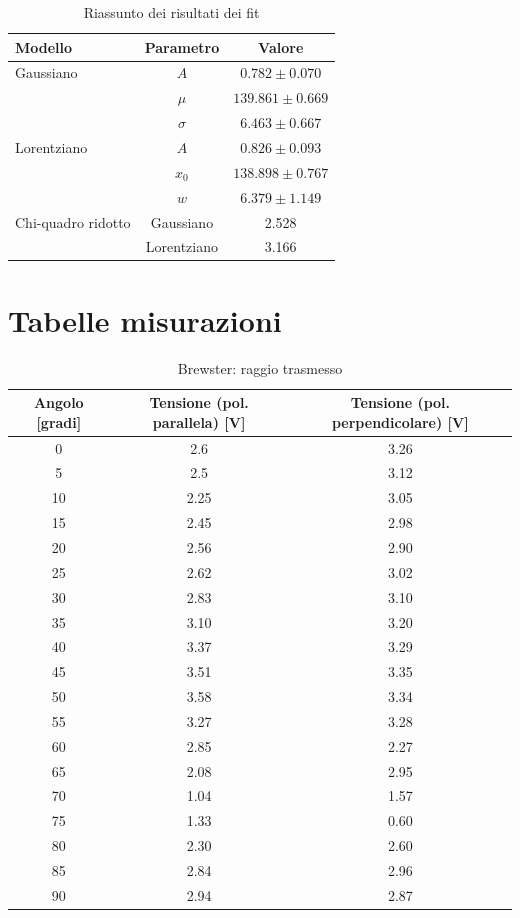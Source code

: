 \documentclass[letterpaper,12pt]{article}
\begin{document}
\begin{table}[h!]
    \centering
    \caption{Riassunto dei risultati dei fit}
    \label{tab:fit_results}
    \begin{tabular}{|l|c|c|}
        \hline
        \textbf{Modello} & \textbf{Parametro} & \textbf{Valore} \\
        \hline
        Gaussiano & $A$ & $0.782 \pm 0.070$ \\
                  & $\mu$ & $139.861 \pm 0.669$ \\
                  & $\sigma$ & $6.463 \pm 0.667$ \\
        \hline
        Lorentziano & $A$ & $0.826 \pm 0.093$ \\
                    & $x_0$ & $138.898 \pm 0.767$ \\
                    & $w$ & $6.379 \pm 1.149$ \\
        \hline
        Chi-quadro ridotto & Gaussiano & 2.528 \\
                            & Lorentziano & 3.166 \\
        \hline
    \end{tabular}
\end{table}

\newpage
\section{Tabelle misurazioni}

\begin{table}[h!]
	\centering
	\begin{tabular}{|c|c|c|}
	\hline
	\textbf{Angolo [gradi]} & \textbf{Tensione (pol. parallela) [V]} & \textbf{Tensione (pol. perpendicolare) [V]} \\
	\hline
	0   & 2.6  & 3.26 \\
	5   & 2.5  & 3.12 \\
	10  & 2.25 & 3.05 \\
	15  & 2.45 & 2.98 \\
	20  & 2.56 & 2.90 \\
	25  & 2.62 & 3.02 \\
	30  & 2.83 & 3.10 \\
	35  & 3.10 & 3.20 \\
	40  & 3.37 & 3.29 \\
	45  & 3.51 & 3.35 \\
	50  & 3.58 & 3.34 \\
	55  & 3.27 & 3.28 \\
	60  & 2.85 & 2.27 \\
	65  & 2.08 & 2.95 \\
	70  & 1.04 & 1.57 \\
	75  & 1.33 & 0.60 \\
	80  & 2.30 & 2.60 \\
	85  & 2.84 & 2.96 \\
	90  & 2.94 & 2.87 \\
	\hline
	\end{tabular}
	\caption{Brewster: raggio trasmesso}
	\label{tab:angolo_tensione}
	\end{table}
\end{document}
